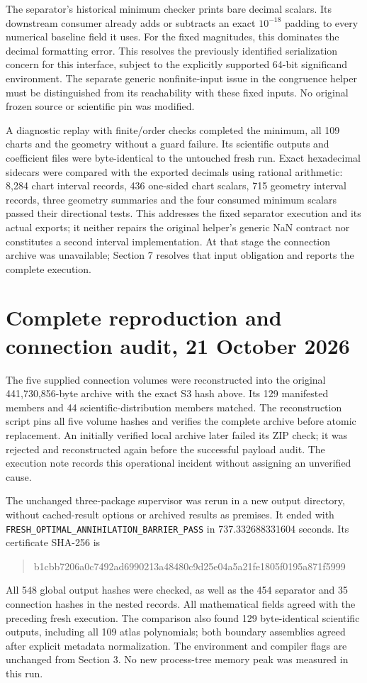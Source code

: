 \documentclass[10pt]{article}
\newcommand{\code}[1]{\nolinkurl{#1}}
\begin{document}
The separator's historical minimum checker prints bare decimal scalars.
Its downstream consumer already adds or subtracts an exact $10^{-18}$
padding to every numerical baseline field it uses. For the fixed
magnitudes, this dominates the decimal formatting error. This resolves
the previously identified serialization concern for this interface,
subject to the explicitly supported 64-bit significand environment.
The separate generic nonfinite-input issue in the congruence helper
must be distinguished from its reachability with these fixed inputs.
No original frozen source or scientific pin was modified.

A diagnostic replay with finite/order checks completed the minimum, all
109 charts and the geometry without a guard failure. Its scientific
outputs and coefficient files were byte-identical to the untouched fresh
run. Exact hexadecimal sidecars were compared with the exported decimals
using rational arithmetic: 8,284 chart interval records, 436 one-sided
chart scalars, 715 geometry interval records, three geometry summaries
and the four consumed minimum scalars passed their directional tests.
This addresses the fixed separator execution and its actual exports;
it neither repairs the original helper's generic NaN contract nor
constitutes a second interval implementation. At that stage the
connection archive was unavailable; Section 7 resolves that input
obligation and reports the complete execution.

\clearpage
\section{Complete reproduction and connection audit, 21 October 2026}

The five supplied connection volumes were reconstructed into the original
441,730,856-byte archive with the exact S3 hash above. Its 129 manifested
members and 44 scientific-distribution members matched. The reconstruction
script pins all five volume hashes and verifies the complete archive
before atomic replacement. An initially verified local archive later
failed its ZIP check; it was rejected and reconstructed again before the
successful payload audit. The execution note records this operational
incident without assigning an unverified cause.

The unchanged three-package supervisor was rerun in a new output directory,
without cached-result options or archived results as premises. It ended
with \code{FRESH_OPTIMAL_ANNIHILATION_BARRIER_PASS} in
737.332688331604 seconds. Its certificate SHA-256 is
\begin{quote}\small\ttfamily
b1cbb7206a0c7492ad6990213a48480c9d25e04a5a21fe1805f0195a871f5999
\end{quote}
All 548 global output hashes were checked, as well as the 454 separator
and 35 connection hashes in the nested records. All mathematical fields
agreed with the preceding fresh execution. The comparison also found
129 byte-identical scientific outputs, including all 109 atlas polynomials;
both boundary assemblies agreed after explicit metadata normalization.
The environment and compiler flags are unchanged from Section 3. No new
process-tree memory peak was measured in this run.
\end{document}
